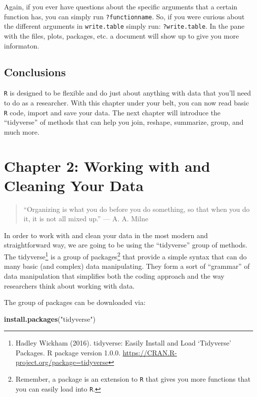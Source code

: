 \documentclass[]{tufte-book}
\newenvironment{Shaded}{}{}
\newcommand{\KeywordTok}[1]{\textcolor[rgb]{0.00,0.44,0.13}{\textbf{#1}}}
\newcommand{\StringTok}[1]{\textcolor[rgb]{0.25,0.44,0.63}{#1}}
\newcommand{\NormalTok}[1]{#1}
\theoremstyle{definition}
\theoremstyle{definition}
\theoremstyle{remark}
\begin{document}
Again, if you ever have questions about the specific arguments that a
certain function has, you can simply run \texttt{?functionname}. So, if
you were curious about the different arguments in \texttt{write.table}
simply run: \texttt{?write.table}. In the pane with the files, plots,
packages, etc. a document will show up to give you more informaton.

\section*{Conclusions}\label{conclusions}

\texttt{R} is designed to be flexible and do just about anything with
data that you'll need to do as a researcher. With this chapter under
your belt, you can now read basic \texttt{R} code, import and save your
data. The next chapter will introduce the ``tidyverse'' of methods that
can help you join, reshape, summarize, group, and much more.

\chapter*{Chapter 2: Working with and Cleaning Your
Data}\label{chapter-2-working-with-and-cleaning-your-data}

\begin{quote}
``Organizing is what you do before you do something, so that when you do
it, it is not all mixed up.'' --- A. A. Milne
\end{quote}

In order to work with and clean your data in the most modern and
straightforward way, we are going to be using the ``tidyverse'' group of
methods. The tidyverse\footnote{Hadley Wickham (2016). tidyverse: Easily
  Install and Load `Tidyverse' Packages. R package version 1.0.0.
  \url{https://CRAN.R-project.org/package=tidyverse}} is a group of
packages\footnote{Remember, a package is an extension to \texttt{R} that
  gives you more functions that you can easily load into \texttt{R}.}
that provide a simple syntax that can do many basic (and complex) data
manipulating. They form a sort of ``grammar'' of data manipulation that
simplifies both the coding approach and the way researchers think about
working with data.

The group of packages can be downloaded via:

\begin{Shaded}
\begin{Highlighting}[]
\KeywordTok{install.packages}\NormalTok{(}\StringTok{"tidyverse"}\NormalTok{)}
\end{Highlighting}
\end{Shaded}
\end{document}
